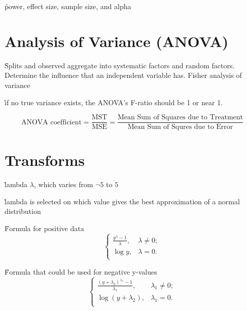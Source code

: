 \r{power, effect size, sample size, and alpha}


\section{Analysis of Variance (ANOVA)}

\r{Splits and observed aggregate into systematic factors and random factors. Determine the influence that an independent variable has. Fisher analysis of variance\cite{fisher1992statistical}}

\r{if no true variance exists, the ANOVA's F-ratio should be 1 or near 1.}

\begin{equation}
	{\textrm{ANOVA coefficient} = \frac{ \textrm{MST}}{\textrm{MSE}} = \frac{  \textrm{Mean Sum of Squares due to Treatment}}{ 
			 \textrm{Mean Sum of Squres due to Error}}}
	\label{eq:anova}
\end{equation}


\section{Transforms}


\r{lambda $\lambda$, which varies from $\neg5$ to $5$}

\r{lambda is selected on which value gives the best approximation of a normal distribution}


\r{Formula for positive data}
\begin{equation}
	\begin{cases} 
		\frac
		{y^\lambda - 1}
		{\lambda},  & \lambda \neq 0; \\
	    \log y, & \lambda = 0. \\
	\end{cases}
\end{equation}



\r{Formula that could be used for negative y-values}
\begin{equation}
	\begin{cases} 
		\frac
		{({{y + \lambda_2}})^{\lambda_1} - 1}
		{\lambda_1},  & {\lambda_1} \neq 0; \\
		\log ({y+{\lambda_2}}), & {\lambda_1} = 0. \\
	\end{cases}
\end{equation}



